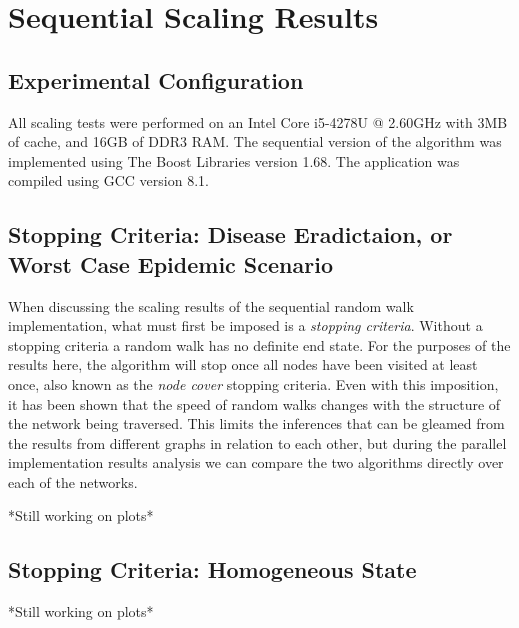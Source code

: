 \section{Sequential Scaling Results}\label{sec:sequential-scaling-\myInitials}

\subsection{Experimental Configuration}
All scaling tests were performed on an Intel Core i5-4278U @ 2.60GHz with 3MB of cache, and 16GB of DDR3 RAM. The sequential version of the algorithm was implemented using The Boost Libraries version 1.68. The application was compiled using GCC version 8.1.

\subsection{Stopping Criteria: Disease Eradictaion, or Worst Case Epidemic Scenario}
When discussing the scaling results of the sequential random walk implementation, what must first be imposed is a \textit{stopping criteria}. Without a stopping criteria a random walk has no definite end state. For the purposes of the results here, the algorithm will stop once all nodes have been visited at least once, also known as the \textit{node cover} stopping criteria. Even with this imposition, it has been shown that the speed of random walks changes with the structure of the network being traversed\cite{Virág99onthe}. This limits the inferences that can be gleamed from the results from different graphs in relation to each other, but during the parallel implementation results analysis we can compare the two algorithms directly over each of the networks.

*Still working on plots*

\subsection{Stopping Criteria: Homogeneous State}
*Still working on plots*

